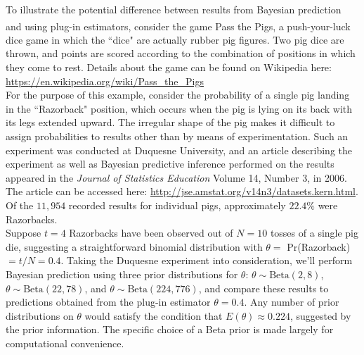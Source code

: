 \documentclass[12pt, a4paper]{article}
\begin{document}
\noindent To illustrate the potential difference between results from Bayesian prediction and using plug-in estimators, consider the game Pass the Pigs\textsuperscript{\circledR}, a push-your-luck dice game in which the ``dice" are actually rubber pig figures.  Two pig dice are thrown, and points are scored according to the combination of positions in which they come to rest.  Details about the game can be found on Wikipedia here: \url{https://en.wikipedia.org/wiki/Pass_the_Pigs}\\

\noindent For the purpose of this example, consider the probability of a single pig landing in the ``Razorback" position, which occurs when the pig is lying on its back with its legs extended upward.  The irregular shape of the pig makes it difficult to assign probabilities to results other than by means of experimentation.  Such an experiment was conducted at Duquesne University, and an article describing the experiment as well as Bayesian predictive inference performed on the results appeared in the \textit{Journal of Statistics Education} Volume 14, Number 3, in 2006.  The article can be accessed here:  \url{http://jse.amstat.org/v14n3/datasets.kern.html}. Of the $11,954$ recorded results for individual pigs, approximately $22.4\%$ were Razorbacks.\\

\noindent Suppose $t=4$ Razorbacks have been observed out of $N=10$ tosses of a single pig die, suggesting a straightforward binomial distribution with $\theta =$ Pr(Razorback) $= t/N = 0.4$. Taking the Duquesne experiment into consideration, we'll perform Bayesian prediction using three prior distributions for $\theta$: $\theta\sim\text{Beta}(2,8)$, $\theta\sim\text{Beta}(22,78)$, and $\theta\sim\text{Beta}(224,776)$, and compare these results to predictions obtained from the plug-in estimator $\theta = 0.4$.   Any number of prior distributions on $\theta$ would satisfy the condition that $E(\theta) \approx 0.224$, suggested by the prior information.  The specific choice of a Beta prior is made largely for computational convenience.\\
\end{document}
